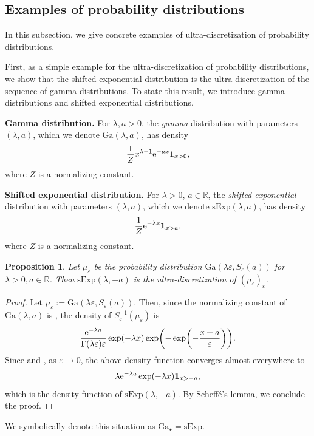\documentclass[pdftex]{sigma}
\numberwithin{equation}{section}
\newtheorem{Proposition}[Theorem]{Proposition}
 { \theoremstyle{definition}
\newtheorem{Definition}[Theorem]{Definition}
\newtheorem{Note}[Theorem]{Note}
\newtheorem{Example}[Theorem]{Example}
\newtheorem{Remark}[Theorem]{Remark} }
\def\R{\mathbb{R}}
\def\e{\varepsilon}
\newcommand{\la}{\lambda}
\begin{document}
\subsection{Examples of probability distributions}
In this subsection, we give concrete examples of
ultra-discretization of probability distributions.

First, as a simple example for the ultra-discretization of probability distributions, we show that the shifted exponential distribution is the ultra-discretization of the sequence of gamma distributions. To state this result, we introduce gamma distributions and shifted exponential distributions.

{\bf Gamma distribution.} For $\lambda, a>0$, the \emph{gamma} distribution with parameters $(\lambda,a)$, which we denote $\mathrm{Ga}(\lambda,a)$, has density
\[\frac{1}{Z} x^{\lambda-1} {\rm e}^{-ax}\mathbf{1}_{x >0}, \]
where $Z$ is a normalizing constant.

{\bf Shifted exponential distribution.} For $\lambda>0$, $a \in \R$, the \emph{shifted exponential} distribution with parameters $(\lambda,a)$, which we denote $\mathrm{sExp} (\lambda,a)$, has density
\[\frac{1}{Z} {\rm e}^{-\la x} \mathbf{1}_{x > a}, \]
where $Z$ is a normalizing constant.

\begin{Proposition}\label{prop:gam}
 Let $\mu_{\e}$ be the probability distribution $\mathrm{Ga}(\la \e,S_{\e}(a))$ for $\la >0,a \in \R$. Then $\mathrm{sExp}(\la, -a)$ is the ultra-discretization of $(\mu_{\e})_{\e}$.
\end{Proposition}

{\samepage

\begin{proof}
 Let $\mu_{\e}:=\mathrm{Ga}(\la \e,S_{\e}(a))$. Then, since the normalizing constant of $\mathrm{Ga}(\lambda,a)$ is \smash{$\frac{\Gamma(\la)}{a^{\la}}$}, the density of $S_{\e}^{-1}(\mu_{\e})$ is
 \[
\frac{{\rm e}^{-\la a}}{\Gamma(\la \e)\e}\exp(-\la x)\exp \biggl(-\exp\biggl(-\frac{x+a}{\e}\biggr)\biggr).
 \]
 Since \smash{$ \lim_{\e \to 0} \Gamma(\la \e) \e =\frac{1}{\la}$} and \smash{$ \lim_{\e \to 0}\exp \bigl(-\exp\bigl(-\frac{x+a}{\e}\bigr)\bigr)=\mathbf{1}_{x > -a} + {\rm e}^{-1} \mathbf{1}_{x=-a}$}, as $\e \to 0$, the above density function converges almost everywhere to
 \[
 \la {\rm e}^{-\la a}\exp(-\la x)\mathbf{1}_{x > -a},
 \]
 which is the density function of $\mathrm{sExp}(\la, -a)$. By Scheff\'e's lemma, we conclude the proof.
\end{proof}

We symbolically denote this situation as $\mathrm{Ga}_{\star}=\mathrm{sExp}$.}
\end{document}
